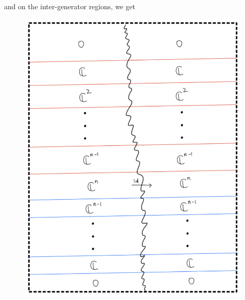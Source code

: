 \begin{enumerate}[label = (Step \arabic*)]
\pagebreak
and on the inter-generator regions, we get
\begin{figure}[H]
    \centering
    \includegraphics[scale = 0.95]{diagrams/cobord_full/6.png}
    \caption{}
    \label{fig:your-label}
\end{figure}
\end{enumerate}
\pagebreak